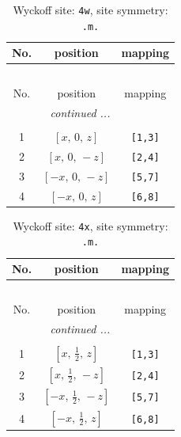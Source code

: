\documentclass[fleqn,8pt]{jsarticle}
\begin{document}
\renewcommand{\arraystretch}{1.2}
\begin{longtable}{ccc}
\caption{Wyckoff site: {\tt 4w}, site symmetry: {\tt .m.}}
 \\
 \hline \hline
No. & position & mapping \\ \hline \endfirsthead

\multicolumn{2}{l}{\tablename\ \thetable{}} \\
 \hline \hline
No. & position & mapping \\ \hline \endhead

 \hline \hline
\multicolumn{2}{r}{\footnotesize\it continued ...} \\ \endfoot

 \hline \hline
\multicolumn{2}{r}{} \\ \endlastfoot

1 & $\left[ x,\, 0,\, z \right]$ & {\tt [1,3]} \\ \hline
2 & $\left[ x,\, 0,\, - z \right]$ & {\tt [2,4]} \\ \hline
3 & $\left[ - x,\, 0,\, - z \right]$ & {\tt [5,7]} \\ \hline
4 & $\left[ - x,\, 0,\, z \right]$ & {\tt [6,8]} \\
\end{longtable}
\renewcommand{\arraystretch}{1.2}
\begin{longtable}{ccc}
\caption{Wyckoff site: {\tt 4x}, site symmetry: {\tt .m.}}
 \\
 \hline \hline
No. & position & mapping \\ \hline \endfirsthead

\multicolumn{2}{l}{\tablename\ \thetable{}} \\
 \hline \hline
No. & position & mapping \\ \hline \endhead

 \hline \hline
\multicolumn{2}{r}{\footnotesize\it continued ...} \\ \endfoot

 \hline \hline
\multicolumn{2}{r}{} \\ \endlastfoot

1 & $\left[ x,\, \frac{1}{2},\, z \right]$ & {\tt [1,3]} \\ \hline
2 & $\left[ x,\, \frac{1}{2},\, - z \right]$ & {\tt [2,4]} \\ \hline
3 & $\left[ - x,\, \frac{1}{2},\, - z \right]$ & {\tt [5,7]} \\ \hline
4 & $\left[ - x,\, \frac{1}{2},\, z \right]$ & {\tt [6,8]} \\
\end{longtable}
\end{document}
